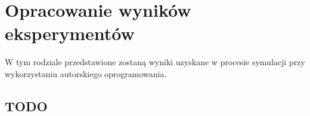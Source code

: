 \documentclass[a4paper,12pt,twoside,openany]{report}
\begin{document}
\chapter{Opracowanie wyników eksperymentów}


W tym rodziale przedstawione zostaną wyniki uzyskane w procesie symulacji przy wykorzystaniu autorskiego oprogramowania.

\section{TODO}



\begin{thebibliography}{99}
\end{thebibliography}

\zakonczenie  %
\end{document}
